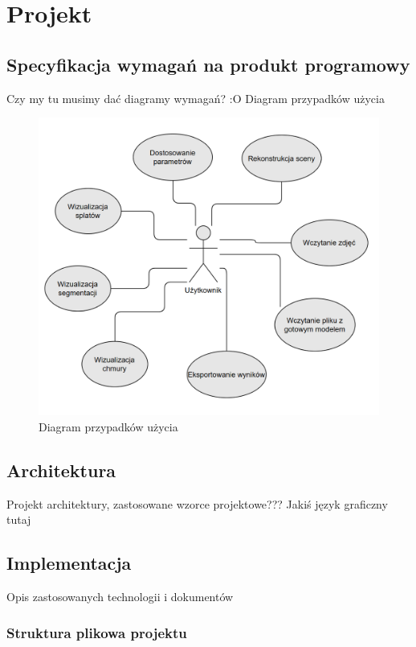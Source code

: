 \section{Projekt}
\subsection{Specyfikacja wymagań na produkt programowy}
Czy my tu musimy dać diagramy wymagań? :O
Diagram przypadków użycia

\begin{figure}[!htb]
  \includegraphics[width=\linewidth]{img/use_case_zpi.png}
  \caption{Diagram przypadków użycia}\label{fig:use_case_diagram}
\end{figure}

\subsection{Architektura}
Projekt architektury, zastosowane wzorce projektowe???
Jakiś język graficzny tutaj

\subsection{Implementacja}
Opis zastosowanych technologii i dokumentów

\subsubsection{Struktura plikowa projektu}

